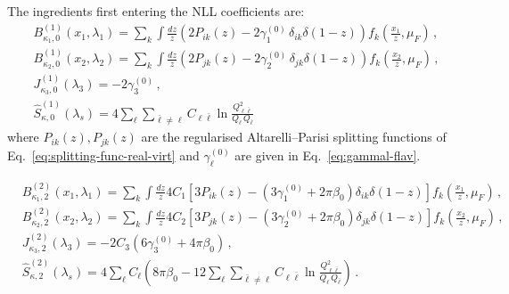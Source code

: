 The ingredients first entering the NLL coefficients are:
\begin{subequations}
\label{eq:C10-ingred}
\begin{align}
&B_{\kappa_{1},0}^{(1)}(x_1,\lambda_1)=\sum_k \int\frac{dz}{z} \left(2P_{ik}(z)-2\gamma_1^{(0)}\,\delta_{ik}\delta(1-z)\right)
f_k\left(\frac{x_1}{z},\mu_F\right)\,, \\[1ex]
&B_{\kappa_{2},0}^{(1)}(x_2,\lambda_2)  =\sum_k \int\frac{dz}{z} \left(2P_{jk}(z)-2\gamma_2^{(0)}\,\delta_{jk}\delta(1-z)\right)
f_k\left(\frac{x_2}{z},\mu_F\right)\,, \\[1ex]
&J_{\kappa_3,0}^{(1)}(\lambda_3) = -2\gamma_3^{(0)}\,, \\[1ex]
&\widehat{S}_{\kappa,0}^{(1)}\left(\lambda_s\right)=4\sum_{\ell}\sum_{\bar{\ell}\neq\ell}C_{\ell\bar\ell}\ln\frac{Q_{\ell\bar{\ell}}^2}{Q_{\ell}\,Q_{\bar{\ell}}}
\end{align}
\end{subequations}
where $P_{ik}(z), P_{jk}(z)$ are the regularised Altarelli--Parisi splitting functions of Eq.~\eqref{eq:splitting-func-real-virt}
and $\gamma^{(0)}_{\ell}$ are given in Eq.~\eqref{eq:gammal-flav}.

\begin{subequations}
\label{eq:C22-ingred}
\begin{align}
&B_{\kappa_{1},2}^{(2)}(x_1,\lambda_1) = \sum_{k}\int\frac{dz}{z}4C_1\left[
    3P_{ik}(z) -\left(3\gamma_1^{(0)}+2\pi\beta_0\right)\delta_{ik}\delta(1-z)
   \right]f_k\left(\frac{x_1}{z},\mu_F\right)\,, \\[1ex]
&B_{\kappa_{2},2}^{(2)}(x_2,\lambda_2) = \sum_{k}\int\frac{dz}{z}4C_2\left[
    3P_{jk}(z) -\left(3\gamma_2^{(0)}+2\pi\beta_0\right)\delta_{jk}\delta(1-z)
   \right]f_k\left(\frac{x_2}{z},\mu_F\right)\,, \\[1ex]
 &J_{\kappa_3,2}^{(2)}(\lambda_3) = -2C_3\left(6\gamma_3^{(0)}+4\pi\beta_0\right)\,, \\[1ex]
&\widehat{S}_{\kappa,2}^{(2)}\left(\lambda_s\right)  =
    4\sum_{\ell}C_{\ell}\left(8\pi\beta_0-12\sum_{\ell}\sum_{\bar{\ell}\neq\ell}C_{\ell\bar\ell}\ln\frac{Q_{\ell\bar{\ell}}^2}{Q_{\ell}\,Q_{\bar{\ell}}}\right)\,.
\end{align}
\end{subequations}

